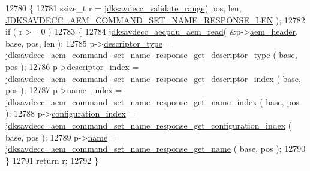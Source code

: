 \begin{DoxyCode}
12780 \{
12781     ssize\_t r = \hyperlink{group__util_ga9c02bdfe76c69163647c3196db7a73a1}{jdksavdecc\_validate\_range}( pos, len, 
      \hyperlink{group__command__set__name__response_ga96ac430b10ef061e0be85f7a77bc3c6f}{JDKSAVDECC\_AEM\_COMMAND\_SET\_NAME\_RESPONSE\_LEN} );
12782     \textcolor{keywordflow}{if} ( r >= 0 )
12783     \{
12784         \hyperlink{group__aecpdu__aem_gae2421015dcdce745b4f03832e12b4fb6}{jdksavdecc\_aecpdu\_aem\_read}( &p->\hyperlink{structjdksavdecc__aem__command__set__name__response_ae1e77ccb75ff5021ad923221eab38294}{aem\_header}, base, pos, len );
12785         p->\hyperlink{structjdksavdecc__aem__command__set__name__response_ab7c32b6c7131c13d4ea3b7ee2f09b78d}{descriptor\_type} = 
      \hyperlink{group__command__set__name__response_ga3a95f51790a717c477cf1729aa02306e}{jdksavdecc\_aem\_command\_set\_name\_response\_get\_descriptor\_type}
      ( base, pos );
12786         p->\hyperlink{structjdksavdecc__aem__command__set__name__response_a042bbc76d835b82d27c1932431ee38d4}{descriptor\_index} = 
      \hyperlink{group__command__set__name__response_gac265a30c605f8469b6add2d6f1dd254d}{jdksavdecc\_aem\_command\_set\_name\_response\_get\_descriptor\_index}
      ( base, pos );
12787         p->\hyperlink{structjdksavdecc__aem__command__set__name__response_a898a74ada625e0b227dadb02901404e6}{name\_index} = 
      \hyperlink{group__command__set__name__response_gad489dfe5dc5ba74fe0f1e4d01d1e7438}{jdksavdecc\_aem\_command\_set\_name\_response\_get\_name\_index}
      ( base, pos );
12788         p->\hyperlink{structjdksavdecc__aem__command__set__name__response_afaad1bd7c66f9611e134d8c5ce98f444}{configuration\_index} = 
      \hyperlink{group__command__set__name__response_ga955980672080aa93ba297af1ce8cfbde}{jdksavdecc\_aem\_command\_set\_name\_response\_get\_configuration\_index}
      ( base, pos );
12789         p->\hyperlink{structjdksavdecc__aem__command__set__name__response_a7e615b51b7768e9b59bfa450051e0f8e}{name} = \hyperlink{group__command__set__name__response_gada94428543e621860b0cf2b7d7196089}{jdksavdecc\_aem\_command\_set\_name\_response\_get\_name}
      ( base, pos );
12790     \}
12791     \textcolor{keywordflow}{return} r;
12792 \}
\end{DoxyCode}


